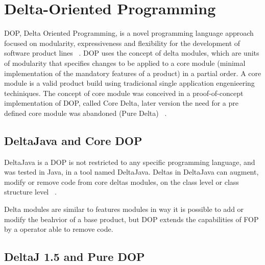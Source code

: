 \section{Delta-Oriented Programming}


DOP, Delta Oriented Programming, is a novel programming language approach focused on  modularity, expressiveness and flexibility for the development of software product lines ~\cite{}. DOP uses the concept of delta modules, which are units of modularity that specifies changes to be applied to a core module (minimal implementation of the mandatory features of a product) in a partial order.
A core module is a valid product build using tradicional single application engenieering techiniques. The concept of core module was conceived in a proof-of-concept implementation of DOP, called Core Delta, later version the need for a pre defined core module was abandoned (Pure Delta) ~\cite{}.

\subsection{DeltaJava and Core DOP}
DeltaJava is a DOP is not restricted to any specific programming language, and was   tested in Java, in a tool named DeltaJava. Deltas in DeltaJava can augment, modify or remove code from core deltas modules, on the class level or class structure level ~\cite{}. 

Delta modules are similar to features modules in way it is possible to add or modify the beahvior of a base product, but DOP extends the capabilities of FOP by a operator able to remove code. 


\subsection{DeltaJ 1.5 and Pure DOP}



